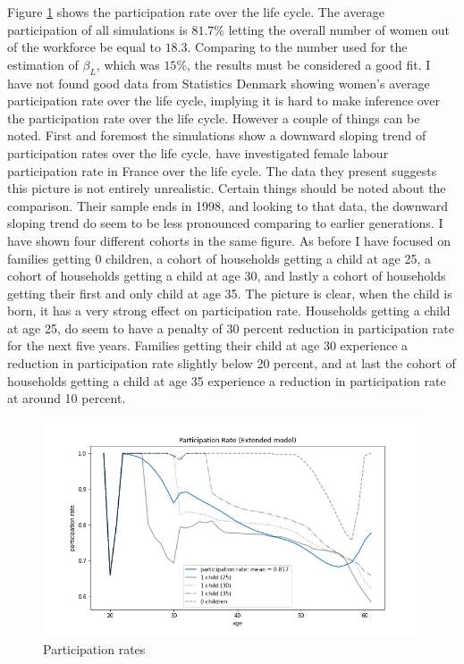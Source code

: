 Figure \ref{fig:ext_model_particpation_rates} shows the participation rate over the life cycle. The average participation of all simulations is $81.7 \%$ letting the overall number of women out of the workforce be equal to $18.3$. Comparing to the number used for the estimation of $\beta_L$, which was $15 \%$, the results must be considered a good fit. I have not found good data from Statistics Denmark showing women's average participation rate over the life cycle, implying it is hard to make inference over the participation rate over the life cycle. However a couple of things can be noted. First and foremost the simulations show a downward sloping trend of participation rates over the life cycle. \textcite{grimm_labour_2001} have investigated female labour participation rate in France over the life cycle. The data  they present suggests this picture is not entirely unrealistic. Certain things should be noted about the comparison. Their sample ends in 1998, and looking to that data, the downward sloping trend do seem to be less pronounced comparing to earlier generations. I have shown four different cohorts in the same figure. As before I have focused on families getting 0 children, a cohort of households getting a child at age 25, a cohort of households getting a child at age 30, and lastly a cohort of households getting their first and only child at age 35. The picture is clear, when the child is born, it has a very strong effect on participation rate. Households getting a child at age 25, do seem to have a penalty of 30 percent reduction in participation rate for the next five years. Families getting their child at age 30 experience a reduction in participation rate slightly below 20 percent, and at last the cohort of households getting a child at age 35 experience a reduction in participation rate at around 10 percent.

\begin{figure}
    \centering
    \includegraphics[scale=0.4]{figures/extended_model_participation_rates.png}
    \caption{Participation rates}
    \label{fig:ext_model_particpation_rates}
\end{figure}

